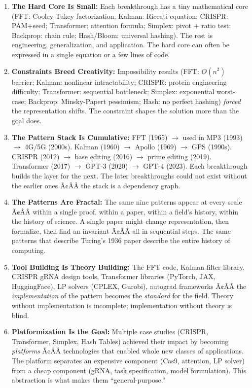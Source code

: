 \begin{enumerate}
\item \textbf{The Hard Core Is Small:} Each breakthrough has a tiny mathematical core (FFT: Cooley-Tukey factorization; Kalman: Riccati equation; CRISPR: PAM+seed; Transformer: attention formula; Simplex: pivot + ratio test; Backprop: chain rule; Hash/Bloom: universal hashing). The rest is engineering, generalization, and application. The hard core can often be expressed in a single equation or a few lines of code.

\item \textbf{Constraints Breed Creativity:} Impossibility results (FFT: $O(n^2)$ barrier; Kalman: nonlinear intractability; CRISPR: protein engineering difficulty; Transformer: sequential bottleneck; Simplex: exponential worst-case; Backprop: Minsky-Papert pessimism; Hash: no perfect hashing) \emph{forced} the representation shifts. The constraint shapes the solution more than the goal does.

\item \textbf{The Pattern Stack Is Cumulative:} FFT (1965) $\to$ used in MP3 (1993) $\to$ 4G/5G (2000s). Kalman (1960) $\to$ Apollo (1969) $\to$ GPS (1990s). CRISPR (2012) $\to$ base editing (2016) $\to$ prime editing (2019). Transformer (2017) $\to$ GPT-3 (2020) $\to$ GPT-4 (2023). Each breakthrough builds the layer for the next. The later breakthroughs could not exist without the earlier ones Ã¢ÂÂ the stack is a dependency graph.

\item \textbf{The Patterns Are Fractal:} The same nine patterns appear at every scale Ã¢ÂÂ within a single proof, within a paper, within a field's history, within the history of science. A single paper might change representation, then formalize, then find an invariant Ã¢ÂÂ all in sequential steps. The same patterns that describe Turing's 1936 paper describe the entire history of computing.

\item \textbf{Tool Building Is Theory Building:} The FFT code, Kalman filter library, CRISPR gRNA design tools, Transformer libraries (PyTorch, JAX, HuggingFace), LP solvers (CPLEX, Gurobi), autograd frameworks Ã¢ÂÂ the \emph{implementation} of the pattern becomes the \emph{standard} for the field. Theory without implementation is incomplete; implementation without theory is blind.

\item \textbf{Platformization Is the Goal:} Multiple case studies (CRISPR, Transformer, Simplex, Hash Tables) achieved their impact by becoming \emph{platforms} Ã¢ÂÂ technologies that enabled whole new classes of applications. The platform separates an expensive component (Cas9, attention, LP solver) from a cheap component (gRNA, task specification, model formulation). This abstraction is what makes them ``general-purpose.''


\end{enumerate}
